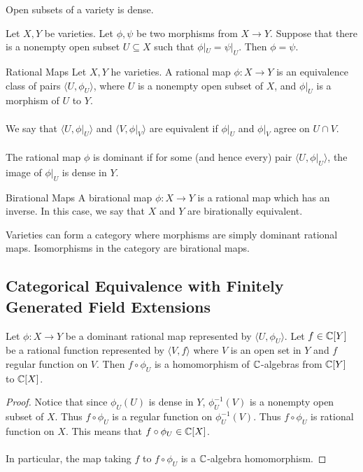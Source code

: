 \documentclass[a4paper]{article}
\begin{document}
\begin{lmm}{}{} Open subsets of a variety is dense. 
\end{lmm}

\begin{lmm}{}{} Let $X,Y$ be varieties. Let $\phi,\psi$ be two morphisms from $X\to Y$. Suppose that there is a nonempty open subset $U\subseteq X$ such that $\phi|_U=\psi|_U$. Then $\phi=\psi$. 
\end{lmm}

\begin{defn}{Rational Maps}{} Let $X,Y$ he varieties. A rational map $\phi:X\to Y$ is an equivalence class of pairs $\langle U,\phi_U\rangle$, where $U$ is a nonempty open subset of $X$, and $\phi|_U$ is a morphism of $U$ to $Y$. \\~\\
We say that $\langle U,\phi|_U\rangle$ and $\langle V,\phi|_V\rangle$ are equivalent if $\phi|_U$ and $\phi|_V$ agree on $U\cap V$. \\~\\
The rational map $\phi$ is dominant if for some (and hence every) pair $\langle U,\phi|_U\rangle$, the image of $\phi|_U$ is dense in $Y$. 
\end{defn}

\begin{defn}{Birational Maps}{} A birational map $\phi:X\to Y$ is a rational map which has an inverse. In this case, we say that $X$ and $Y$ are birationally equivalent. 
\end{defn}

Varieties can form a category where morphisms are simply dominant rational maps. Isomorphisms in the category are birational maps. 

\subsection{Categorical Equivalence with Finitely Generated Field Extensions}
\begin{prp}{}{} Let $\phi:X\to Y$ be a dominant rational map represented by $\langle U,\phi_U\rangle$. Let $f\in \mathbb{C}[Y]$ be a rational function represented by $\langle V,f\rangle$ where $V$ is an open set in $Y$ and $f$ regular function on $V$. Then $f\circ\phi_U$ is a homomorphism of $\mathbb{C}$-algebras from $\mathbb{C}[Y]$ to $\mathbb{C}[X]$. \tcbline
\begin{proof}
Notice that since $\phi_U(U)$ is dense in $Y$, $\phi_U^{-1}(V)$ is a nonempty open subset of $X$. Thus $f\circ\phi_U$ is a regular function on $\phi_U^{-1}(V)$. Thus $f\circ\phi_U$ is rational function on $X$. This means that $f\circ\phi_U\in\mathbb{C}[X]$. \\~\\
In particular, the map taking $f$ to $f\circ\phi_U$ is a $\mathbb{C}$-algebra homomorphism. 
\end{proof}
\end{prp}
\end{document}
